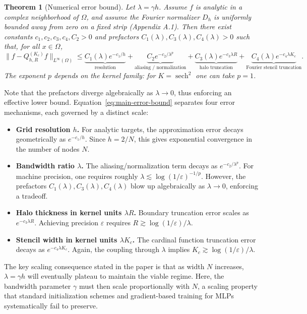 \documentclass[11pt]{article}
\newtheorem{theorem}{Theorem}
\newcommand{\eps}{\varepsilon}
\newcommand{\sech}{\operatorname{sech}}
\begin{document}
\begin{theorem}[Numerical error bound]
\label{thm:numerical-error-bound}
Let $\lambda=\gamma h$. Assume $f$ is analytic in a complex neighborhood of $\Omega$, and assume the Fourier normalizer $D_h$ is uniformly bounded away from zero on a fixed strip (Appendix A.1). Then there exist constants $c_1,c_2,c_3,c_4,C_2>0$ and prefactors $C_1(\lambda),C_3(\lambda),C_4(\lambda)>0$ such that, for all $x\in\Omega$,
\begin{equation}
\|f-Q_{h,R}^{(K_c)}f\|_{L^\infty(\Omega)}
\le
\underbrace{C_1(\lambda)e^{-c_1/h}}_{\text{resolution}}
+
\underbrace{C_2 e^{-c_2/\lambda^p}}_{\text{aliasing / normalization}}
+
\underbrace{C_3(\lambda)e^{-c_3\lambda R}}_{\text{halo truncation}}
+
\underbrace{C_4(\lambda)e^{-c_4\lambda K_c}}_{\text{Fourier stencil truncation}}.
\label{eq:main-error-bound}
\end{equation}
The exponent $p$ depends on the kernel family: for $K=\sech^2$ one can take $p=1$.
\end{theorem}

Note that the prefactors diverge algebraically as $\lambda\to 0$, thus enforcing an effective lower bound.
Equation~\eqref{eq:main-error-bound} separates four error mechanisms, each governed by a distinct scale:
\begin{itemize}
    \item \textbf{Grid resolution $h$.} For analytic targets, the approximation error decays geometrically as $e^{-c_1/h}$. Since $h=2/N$, this gives exponential convergence in the number of nodes $N$.
    \item \textbf{Bandwidth ratio $\lambda$.} The aliasing/normalization term decays as $e^{-c_2/\lambda^p}$. For machine precision, one requires roughly $\lambda\lesssim \log(1/\eps)^{-1/p}$. However, the prefactors $C_1(\lambda),C_3(\lambda),C_4(\lambda)$ blow up algebraically as $\lambda\to 0$, enforcing a tradeoff.
    \item \textbf{Halo thickness in kernel units $\lambda R$.} Boundary truncation error scales as $e^{-c_3\lambda R}$. Achieving precision $\eps$ requires $R\gtrsim \log(1/\eps)/\lambda$.
    \item \textbf{Stencil width in kernel units $\lambda K_c$.} The cardinal function truncation error decays as $e^{-c_4\lambda K_c}$. Again, the coupling through $\lambda$ implies $K_c\gtrsim \log(1/\eps)/\lambda$.
\end{itemize}

The key scaling consequence stated in the paper is that as width $N$ increases, $\lambda=\gamma h$ will eventually plateau to maintain the viable regime. Here, the bandwidth parameter $\gamma$ must then scale proportionally with $N$, a scaling property that standard initialization schemes and gradient-based training for MLPs systematically fail to preserve.
\end{document}
